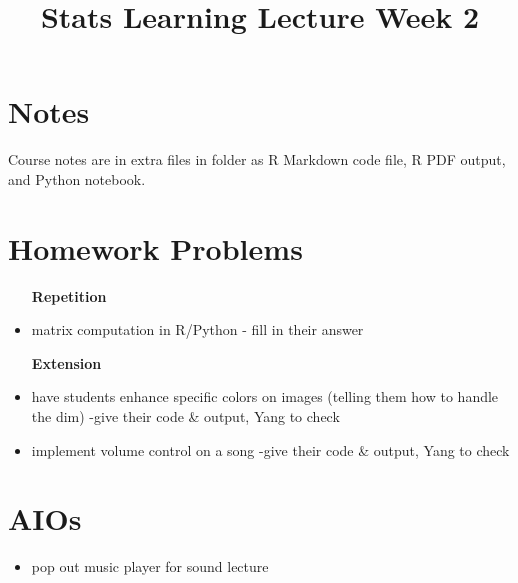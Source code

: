 \documentclass[a4paper]{article}
\title{Stats Learning Lecture Week 2}
\begin{document}
\section{Notes}

Course notes are in extra files in folder as R Markdown code file, R PDF output, and Python notebook.

\section{Homework Problems}
        \begin{itemize} 
            \item [\textbf{Repetition}]
            \item matrix computation in R/Python - fill in their answer
        \end{itemize}
        \begin{itemize} 
            \item [\textbf{Extension}]
            \item have students enhance specific colors on images (telling them how to handle the dim) -give their code \& output, Yang to check
            \item implement volume control on a song -give their code \& output, Yang to check
        \end{itemize}
        
\section{AIOs}
        \begin{itemize}
            \item pop out music player for sound lecture
        \end{itemize} 
\end{document}
